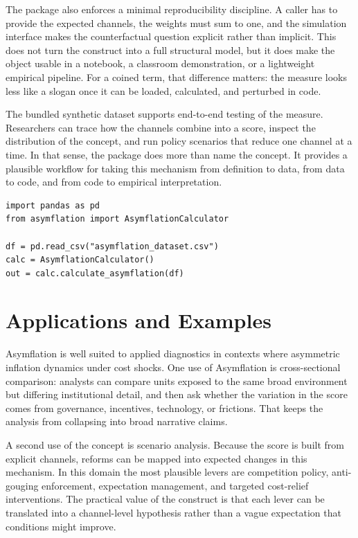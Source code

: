 \documentclass[12pt]{article}
\begin{document}
The package also enforces a minimal reproducibility discipline. A caller has to provide the expected channels, the weights must sum to one, and the simulation interface makes the counterfactual question explicit rather than implicit. This does not turn the construct into a full structural model, but it does make the object usable in a notebook, a classroom demonstration, or a lightweight empirical pipeline. For a coined term, that difference matters: the measure looks less like a slogan once it can be loaded, calculated, and perturbed in code.

The bundled synthetic dataset supports end-to-end testing of the measure. Researchers can trace how the channels combine into a score, inspect the distribution of the concept, and run policy scenarios that reduce one channel at a time. In that sense, the package does more than name the concept. It provides a plausible workflow for taking this mechanism from definition to data, from data to code, and from code to empirical interpretation.

\begin{verbatim}
import pandas as pd
from asymflation import AsymflationCalculator

df = pd.read_csv("asymflation_dataset.csv")
calc = AsymflationCalculator()
out = calc.calculate_asymflation(df)
\end{verbatim}

\section{Applications and Examples}
Asymflation is well suited to applied diagnostics in contexts where asymmetric inflation dynamics under cost shocks. One use of Asymflation is cross-sectional comparison: analysts can compare units exposed to the same broad environment but differing institutional detail, and then ask whether the variation in the score comes from governance, incentives, technology, or frictions. That keeps the analysis from collapsing into broad narrative claims.

A second use of the concept is scenario analysis. Because the score is built from explicit channels, reforms can be mapped into expected changes in this mechanism. In this domain the most plausible levers are competition policy, anti-gouging enforcement, expectation management, and targeted cost-relief interventions. The practical value of the construct is that each lever can be translated into a channel-level hypothesis rather than a vague expectation that conditions might improve.
\end{document}
